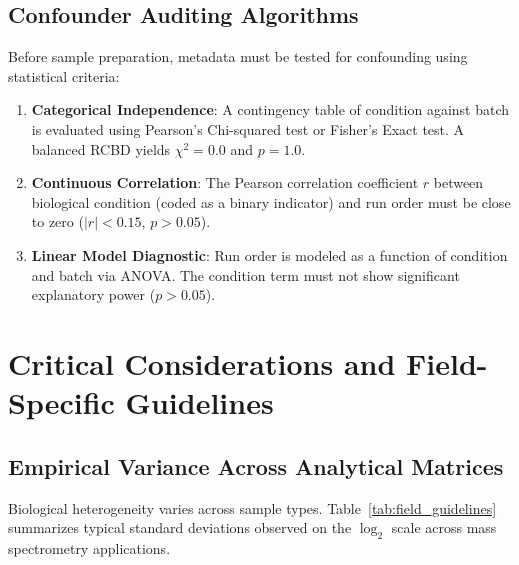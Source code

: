 \documentclass[11pt,twoside,openright]{book}
\begin{document}
\subsection{Confounder Auditing Algorithms}

Before sample preparation, metadata must be tested for confounding using statistical criteria:
\begin{enumerate}
    \item \textbf{Categorical Independence}: A contingency table of condition against batch is evaluated using Pearson's Chi-squared test or Fisher's Exact test. A balanced RCBD yields $\chi^2 = 0.0$ and $p = 1.0$.
    \item \textbf{Continuous Correlation}: The Pearson correlation coefficient $r$ between biological condition (coded as a binary indicator) and run order must be close to zero ($|r| < 0.15$, $p > 0.05$).
    \item \textbf{Linear Model Diagnostic}: Run order is modeled as a function of condition and batch via ANOVA. The condition term must not show significant explanatory power ($p > 0.05$).
\end{enumerate}

\section{Critical Considerations and Field-Specific Guidelines}

\subsection{Empirical Variance Across Analytical Matrices}

Biological heterogeneity varies across sample types. Table~\ref{tab:field_guidelines} summarizes typical standard deviations observed on the $\log_2$ scale across mass spectrometry applications.
\end{document}
